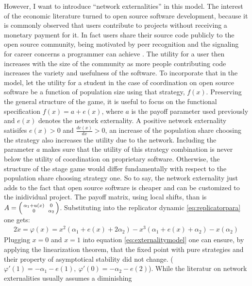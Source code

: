 \documentclass[11pt]{article}
\begin{document}
However, I want to introduce ``network externalities'' in this model. 
The interest of the economic literature turned to open source software 
development, because it is commonly observed that users contribute to 
projects without receiving a monetary payment for it.
In fact users share their source code publicly to the open source community,
being motivated by peer recognition and the signaling for career concerns
a programmer can achieve \parencite[21]{lerner_simple_2002}.
The utility for a user then increases with the size of the community as 
more people contributing code increases the variety and usefulness of the 
software. 
To incorporate that in the model, let the utility for a student 
in the case of coordination on open source software be a function of 
population size using that strategy, $f(x)$. 
Preserving the general structure of the
game, it is useful to focus on the functional specification 
$f(x) = a + e(x)$, where $a$ is the payoff parameter used 
previously and $e(x)$ denotes the network externality. 
A positive network externality satisifes $e(x)>0$ and 
$\frac{de(x)}{dx}>0$, 
an increase of the population share choosing the strategy
also increases the utility due to the network. 
Including the parameter $a$ makes sure that the utility of this 
strategy combination is never below the utility of coordination on 
proprietary software. Otherwise, the structure of the stage game would 
differ fundamentally with respect to the population share choosing strategy 
one. So to say, the network externality just adds to the fact that open 
source software is cheaper and can be customized to the inidividual project.
The payoff matrix, using local shifts, than is 
$A=\begin{psmallmatrix}\alpha_1+u(x) && 0 \\ 0&& \alpha_2\end{psmallmatrix}$. 
Substituting into the replicator dynamic  \ref{eq:replicatorpara} one gets:
\begin{alignat}{2}
        \dot{x} = \varphi(x) = x^2(\alpha_1+e(x) +2\alpha_2 ) 
        - x^3(\alpha_1+e(x)+\alpha_2) - x(\alpha_2)
        \label{eq:externalitymodel}
\end{alignat}
Plugging $x=0$ and $x=1$ into equation \eqref{eq:externalitymodel} one can 
ensure, by applying the linearization theorem,
that the fixed point with pure strategies and their
property of asymptotical stability did not change.
($\varphi'(1) = -\alpha_1 -e(1),\ \varphi'(0) = -\alpha_2 -e(2)$).
While the literatur on network externalities usually assumes a diminishing
\end{document}
